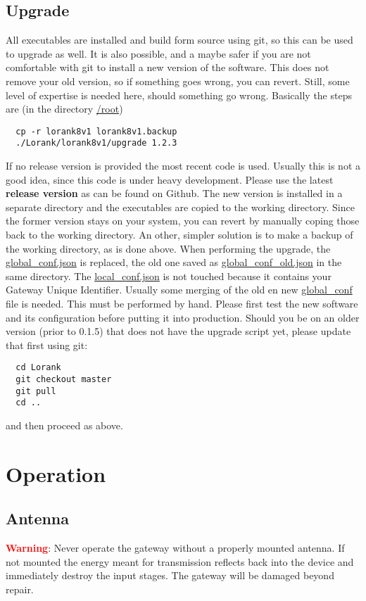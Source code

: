 \documentclass[12pt]{article}
\begin{document}
\subsection{Upgrade}
All executables are installed and build form source using git, so this can
be used to upgrade as well. It is also possible, and a maybe safer if you are
not comfortable with git to install a new version of the 
software. This does not remove your old version, so if something goes wrong,
you can revert. Still, some level of expertise is needed here, should something 
go wrong. Basically the steps are (in the directory \url{/root})
\begin{verbatim}
  cp -r lorank8v1 lorank8v1.backup
  ./Lorank/lorank8v1/upgrade 1.2.3  
\end{verbatim}
If no release version is provided the most recent code is used. Usually this is not
a good idea, since this code is under heavy development. Please use the latest
{\bf release version} as can be found on Github. The new version is installed in a
separate directory and the executables are copied to the working directory.
Since the former version stays on your system, you can revert by manually
coping those back to the working directory. An other, simpler solution is to
make a backup of the working directory, as is done above.
When performing the upgrade, the \url{global_conf.json} is replaced, the old one 
saved as \url{global_conf_old.json} in the same directory. 
The \url{local_conf.json} is not touched because it contains your Gateway 
Unique Identifier. Usually some merging of the old en new \url{global_conf} file
is needed. This must be performed by hand. Please first test the new software 
and its configuration before putting it into production.
Should you be on an older version (prior to 0.1.5) that does not have the 
upgrade script yet, please update that first using git:
\begin{verbatim}
  cd Lorank
  git checkout master
  git pull
  cd ..  
\end{verbatim}
and then proceed as above. 

\section{Operation}

\subsection{Antenna}
{\bf\textcolor{red}{Warning}}: Never operate the gateway without a properly mounted antenna.
If not mounted the energy meant for transmission reflects back into the
device and immediately destroy the input stages. The gateway will be 
damaged beyond repair.
\end{document}
